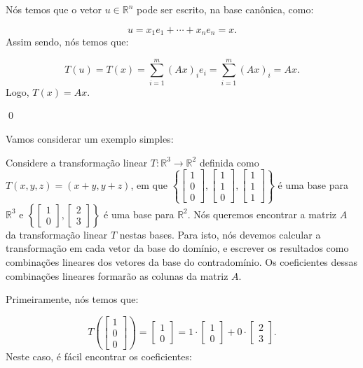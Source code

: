 \begin{Proof}
	Nós temos que o vetor $u\in\mathbb{R}^n$ pode ser escrito, na base canônica, como:
	
	$$
	u = x_1e_1 + \cdots + x_ne_n = x.
	$$
	Assim sendo, nós temos que:
	
	$$
	T(u) = T(x) = \sum\limits_{i = 1}^{m} (Ax)_ie_i = \sum\limits_{i = 1}^{m} (Ax)_i = Ax.
	$$
	Logo, $T(x) = Ax$.
	
	\qed
\end{Proof}

Vamos considerar um exemplo simples:

\begin{Example}
	Considere a transformação linear $T:\mathbb{R}^3\to\mathbb{R}^2$ definida como $T(x, y, z) = (x + y, y + z)$, em que $\left\{\begin{bmatrix}
		1 \\
		0 \\
		0
	\end{bmatrix}, \begin{bmatrix}
		1 \\
		1 \\
		0
	\end{bmatrix}, \begin{bmatrix}
		1 \\
		1 \\
		1
	\end{bmatrix}\right\}$ é uma base para $\mathbb{R}^3$ e $\left\{\begin{bmatrix}
		1 \\
		0
	\end{bmatrix}, \begin{bmatrix}
		2 \\
		3
	\end{bmatrix}\right\}$ é uma base para $\mathbb{R}^2$. Nós queremos encontrar a matriz $A$ da transformação linear $T$ nestas bases. Para isto, nós devemos calcular a transformação em cada vetor da base do domínio, e escrever os resultados como combinações lineares dos vetores da base do contradomínio. Os coeficientes dessas combinações lineares formarão as colunas da matriz $A$.
	
	Primeiramente, nós temos que:
	
	$$
	T\left(\begin{bmatrix}
		1 \\
		0 \\
		0
	\end{bmatrix}\right) = \begin{bmatrix}
		1 \\
		0
	\end{bmatrix} = 1\cdot\begin{bmatrix}
		1 \\
		0
	\end{bmatrix} + 0\cdot\begin{bmatrix}
		2 \\
		3
	\end{bmatrix}.
	$$
	Neste caso, é fácil encontrar os coeficientes:
	

\end{Example}
